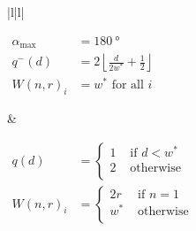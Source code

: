 \begin{table}%
\caption{
} %
\label{beading_schemes}
%
\setlength{\figwidth}{.45\linewidth}
\captionsetup[subtable]{justification=justified,singlelinecheck=false}
%
%
%
\begin{tabular}{|l|l|}
\hline
%
%
\begin{subtable}[b]{\figwidth}
\smallskip
\caption{Uniform scheme}\label{formula_uniform}
$\begin{aligned}
\alpha_\text{max} &= \SI{180}{\degree} \\
q^-(d) &= 2 \left\lfloor \frac{d}{ 2w^*} + \frac12 \right\rfloor \\
W(n,r)_i &= w^* \text{ for all } i 
\end{aligned}$
\end{subtable}
%
%
&
%
%
\begin{subtable}[b]{\figwidth}
\smallskip
\caption{Outer bead}\label{formula_outer_bead}
$\begin{aligned}
q(d) &=
\begin{cases}
1 & \text{ if } d < w^* \\
2 & \text{ otherwise } \\
\end{cases}
 \\
W(n,r)_i &= 
\begin{cases}
2r & \text{ if } n = 1 \\
w^* & \text{ otherwise } \\
\end{cases}
\end{aligned}$
\end{subtable}
%
%
 \\ \hline
%
%
\end{tabular}
\end{table}
